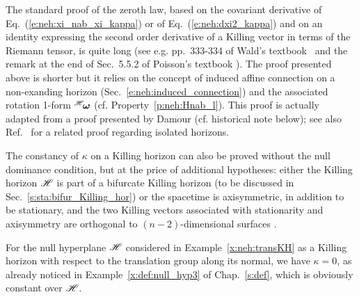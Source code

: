 \begin{remark}
The standard proof of the zeroth law, based on the covariant derivative
of Eq.~(\ref{e:neh:xi_nab_xi_kappa}) \cite{BardeCH73,Wald84} or of Eq.~(\ref{e:neh:dxi2_kappa})
\cite{Heusl96} and on an identity expressing the second order derivative of
a Killing vector in terms of the Riemann tensor, is quite long (see
e.g. pp.~333-334 of Wald's textbook~\cite{Wald84} and the remark at the end of Sec.~5.5.2 of Poisson's
textbook \cite{Poiss04}). The proof presented above is shorter but it relies on
the concept of induced affine connection on a non-exanding horizon
(Sec.~\ref{e:neh:induced_connection}) and the associated rotation
1-form ${}^{\mathscr{H}}\!\bm{\omega}$ (cf.
Property~\ref{p:neh:Hnab_l}). This proof is actually adapted from a proof
presented by Damour \cite{Damou79,Damou82} (cf. historical note below); see
also Ref.~\cite{AshteBL01} for a related proof regarding isolated horizons.
\end{remark}

\begin{remark}
\label{r:neh:zero_law_wo_NDEC}
The constancy of $\kappa$ on a Killing horizon can also be proved without the
null dominance condition, but at the price of additional hypotheses:
either the Killing horizon $\mathscr{H}$ is part of a bifurcate Killing horizon
(to be discussed in Sec.~\ref{s:sta:bifur_Killing_hor}) \cite{KayW91,Wald92,Poiss04}
or the spacetime is axisymmetric, in addition to be stationary, and
the two Killing vectors associated
with stationarity and
axisymmetry are orthogonal to $(n-2)$-dimensional
surfaces \cite{Carte73b,RaczW96}.
\end{remark}

\begin{example}
\label{x:neh:transKH_kappa}
For the null hyperplane $\mathscr{H}$ considered in Example~\ref{x:neh:transKH} as a Killing horizon with respect to the translation group along its normal, we have
$\kappa = 0$, as already noticed in Example~\ref{x:def:null_hyp3} of Chap.~\ref{s:def},
which is obviously constant over $\mathscr{H}$.
\end{example}

